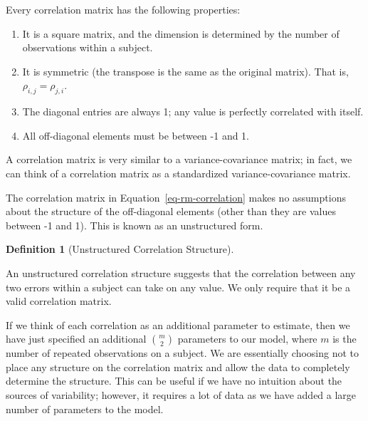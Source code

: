 \documentclass[
  letterpaper,
  DIV=11,
  numbers=noendperiod]{scrreprt}
\providecommand{\tightlist}{%
  \setlength{\itemsep}{0pt}\setlength{\parskip}{0pt}}\usepackage{longtable,booktabs,array}
\theoremstyle{definition}
\newtheorem{definition}{Definition}[chapter]
\theoremstyle{definition}
\theoremstyle{remark}
\begin{document}
\begin{tcolorbox}[enhanced jigsaw, left=2mm, toprule=.15mm, arc=.35mm, breakable, opacitybacktitle=0.6, opacityback=0, rightrule=.15mm, colbacktitle=quarto-callout-note-color!10!white, coltitle=black, leftrule=.75mm, toptitle=1mm, colframe=quarto-callout-note-color-frame, titlerule=0mm, title=\textcolor{quarto-callout-note-color}{\faInfo}\hspace{0.5em}{Properties of Correlation Matrices}, bottomrule=.15mm, colback=white, bottomtitle=1mm]

Every correlation matrix has the following properties:

\begin{enumerate}
\def\labelenumi{\arabic{enumi}.}
\tightlist
\item
  It is a square matrix, and the dimension is determined by the number
  of observations within a subject.
\item
  It is symmetric (the transpose is the same as the original matrix).
  That is, \(\rho_{i,j} = \rho_{j,i}\).
\item
  The diagonal entries are always 1; any value is perfectly correlated
  with itself.
\item
  All off-diagonal elements must be between -1 and 1.
\end{enumerate}

\end{tcolorbox}

A correlation matrix is very similar to a variance-covariance matrix; in
fact, we can think of a correlation matrix as a standardized
variance-covariance matrix.

The correlation matrix in Equation~\ref{eq-rm-correlation} makes no
assumptions about the structure of the off-diagonal elements (other than
they are values between -1 and 1). This is known as an unstructured
form.

\begin{definition}[Unstructured Correlation
Structure]\protect\hypertarget{def-unstructured-correlation-structure}{}\label{def-unstructured-correlation-structure}

An unstructured correlation structure suggests that the correlation
between any two errors within a subject can take on any value. We only
require that it be a valid correlation matrix.

\end{definition}

If we think of each correlation as an additional parameter to estimate,
then we have just specified an additional \(\binom{m}{2}\) parameters to
our model, where \(m\) is the number of repeated observations on a
subject. We are essentially choosing not to place any structure on the
correlation matrix and allow the data to completely determine the
structure. This can be useful if we have no intuition about the sources
of variability; however, it requires a lot of data as we have added a
large number of parameters to the model.
\end{document}
